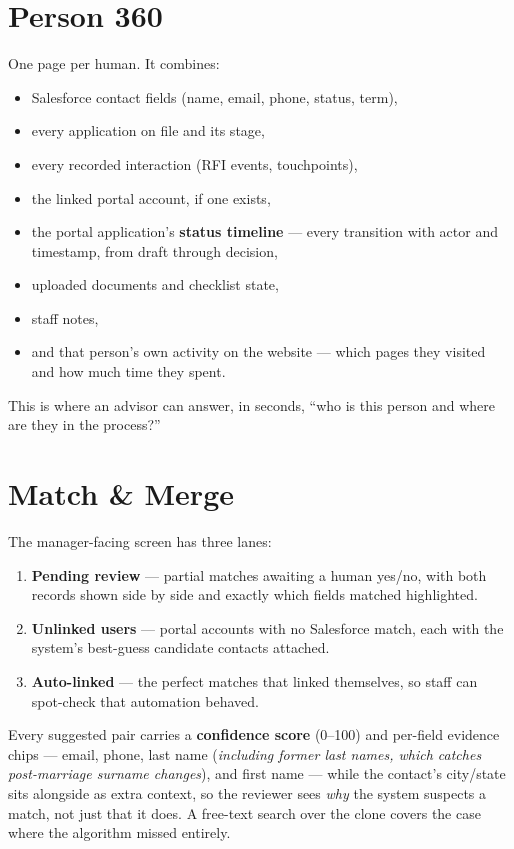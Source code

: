 \documentclass[11pt,letterpaper]{report}
\begin{document}
\section{Person 360}

One page per human. It combines:

\begin{itemize}[leftmargin=1.4em]
  \item Salesforce contact fields (name, email, phone, status, term),
  \item every application on file and its stage,
  \item every recorded interaction (RFI events, touchpoints),
  \item the linked portal account, if one exists,
  \item the portal application's \textbf{status timeline} --- every transition
        with actor and timestamp, from draft through decision,
  \item uploaded documents and checklist state,
  \item staff notes,
  \item and that person's own activity on the website --- which pages they
        visited and how much time they spent.
\end{itemize}

This is where an advisor can answer, in seconds, ``who is this person and where
are they in the process?''

\section{Match \& Merge}

The manager-facing screen has three lanes:

\begin{enumerate}[leftmargin=1.6em]
  \item \textbf{Pending review} --- partial matches awaiting a human yes/no,
        with both records shown side by side and exactly which fields matched
        highlighted.
  \item \textbf{Unlinked users} --- portal accounts with no Salesforce match,
        each with the system's best-guess candidate contacts attached.
  \item \textbf{Auto-linked} --- the perfect matches that linked themselves, so
        staff can spot-check that automation behaved.
\end{enumerate}

Every suggested pair carries a \textbf{confidence score} (0--100) and
per-field evidence chips --- email, phone, last name (\emph{including former
last names, which catches post-marriage surname changes}), and first name ---
while the contact's city/state sits alongside as extra context, so the
reviewer sees \emph{why} the system suspects a match, not just that it does.
A free-text search over the clone covers the case where the algorithm missed
entirely.
\end{document}
